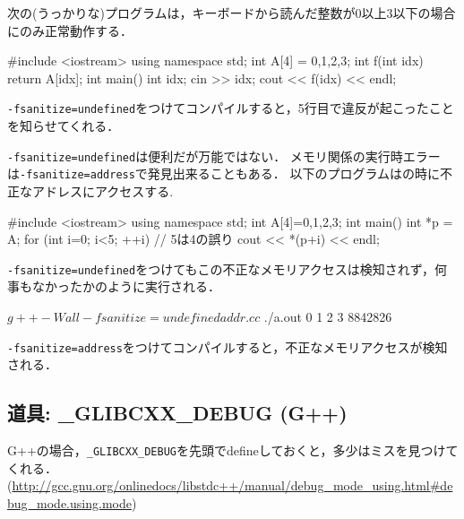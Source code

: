 次の(うっかりな)プログラムは，キーボードから読んだ整数が0以上3以下の場合にのみ正常動作する．
\begin{cbox}
#include <iostream>
using namespace std;
int A[4] = {0,1,2,3};
int f(int idx) {
  return A[idx];
}
int main() {
  int idx;
  cin >> idx;
  cout << f(idx) << endl;
}
\end{cbox}

\texttt{-fsanitize=undefined}をつけてコンパイルすると，5行目で違反が起こったことを知らせてくれる．


\texttt{-fsanitize=undefined}は便利だが万能ではない．
メモリ関係の実行時エラーは\texttt{-fsanitize=address}で発見出来ることもある．
以下のプログラムはの時に不正なアドレスにアクセスする.
\begin{cbox}
#include <iostream>
using namespace std;
int A[4]={0,1,2,3};
int main() {
  int *p = A;
  for (int i=0; i<5; ++i) // 5は4の誤り
    cout << *(p+i) << endl;
}  
\end{cbox}
\texttt{-fsanitize=undefined}をつけてもこの不正なメモリアクセスは検知されず，何事もなかったかのように実行される．
\begin{terminal}[emph={fsanitize,undefined}]
$ g++ -Wall -fsanitize=undefined addr.cc 
$ ./a.out 
0
1
2
3
8842826
\end{terminal}

\texttt{-fsanitize=address}をつけてコンパイルすると，不正なメモリアクセスが検知される．

\subsection{道具: \_GLIBCXX\_DEBUG (G++)}

G++の場合，\texttt{\_GLIBCXX\_DEBUG}を先頭でdefineしておくと，多少はミスを見つけてくれる．
(\url{http://gcc.gnu.org/onlinedocs/libstdc++/manual/debug_mode_using.html#debug_mode.using.mode})

